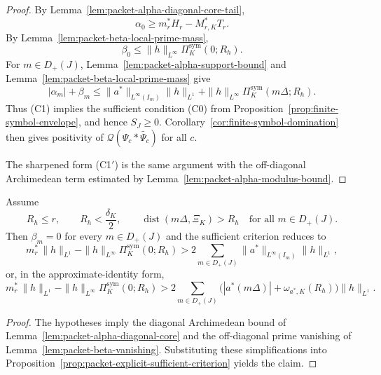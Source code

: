 \begin{proof}
By Lemma~\ref{lem:packet-alpha-diagonal-core-tail},
\[
  \alpha_0\ge m_r^*H_r - M_{r,K}^*T_r.
\]
By Lemma~\ref{lem:packet-beta-local-prime-mass},
\[
  \beta_0\le \|h\|_{L^\infty}\Pi_K^{\mathrm{sym}}(0;R_h).
\]
For $m\in D_+(J)$, Lemma~\ref{lem:packet-alpha-support-bound} and
Lemma~\ref{lem:packet-beta-local-prime-mass} give
\[
  |\alpha_m|+\beta_m
  \le
  \|a^*\|_{L^\infty(I_m)}\|h\|_{L^1}
  +
  \|h\|_{L^\infty}\Pi_K^{\mathrm{sym}}(m\Delta;R_h).
\]
Thus \textup{(C1)} implies the sufficient condition \textup{(C0)} from
Proposition~\ref{prop:finite-symbol-envelope}, and hence $S_J\ge0$.
Corollary~\ref{cor:finite-symbol-domination} then gives positivity of
$\mathcal Q(\Psi_c*\widetilde{\Psi_c})$ for all $c$.

The sharpened form \textup{(C1$'$)} is the same argument with the off-diagonal
Archimedean term estimated by Lemma~\ref{lem:packet-alpha-modulus-bound}.
\end{proof}

\begin{corollary}\label{cor:packet-sparse-dictionary}
Assume
\[
  R_h\le r,
  \qquad
  R_h<\frac{\delta_K}{2},
  \qquad
  \operatorname{dist}(m\Delta,\Xi_K)>R_h
  \quad\text{for all }m\in D_+(J).
\]
Then $\beta_m=0$ for every $m\in D_+(J)$ and the sufficient criterion reduces
to
\[
  m_r^*\,\|h\|_{L^1}
  -
  \|h\|_{L^\infty}\Pi_K^{\mathrm{sym}}(0;R_h)
  >
  2\sum_{m\in D_+(J)}
  \|a^*\|_{L^\infty(I_m)}\|h\|_{L^1},
  \tag{C2}
\]
or, in the approximate-identity form,
\[
  m_r^*\,\|h\|_{L^1}
  -
  \|h\|_{L^\infty}\Pi_K^{\mathrm{sym}}(0;R_h)
  >
  2\sum_{m\in D_+(J)}
  \bigl(|a^*(m\Delta)|+\omega_{a^*,K}(R_h)\bigr)\|h\|_{L^1}.
  \tag{C2$'$}
\]
\end{corollary}

\begin{proof}
The hypotheses imply the diagonal Archimedean bound of
Lemma~\ref{lem:packet-alpha-diagonal-core} and the off-diagonal prime vanishing
of Lemma~\ref{lem:packet-beta-vanishing}. Substituting these simplifications
into Proposition~\ref{prop:packet-explicit-sufficient-criterion} yields the
claim.
\end{proof}

